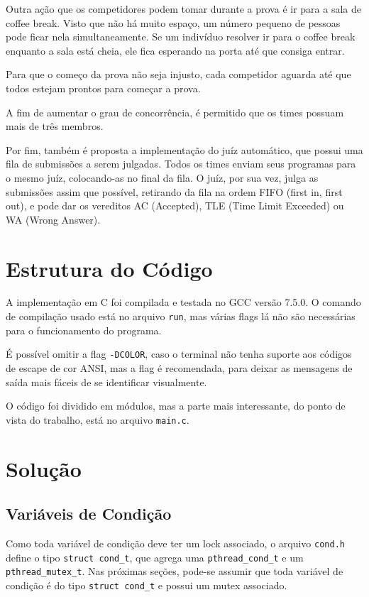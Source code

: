 \documentclass[11pt]{article}
\newcommand{\code}{\lstinline[mathescape=true]}
\begin{document}
Outra ação que os competidores podem tomar durante a prova é ir para a sala de coffee break. Visto
que não há muito espaço, um número pequeno de pessoas pode ficar nela simultaneamente. Se um
indivíduo resolver ir para o coffee break enquanto a sala está cheia, ele fica esperando na porta até
que consiga entrar.

Para que o começo da prova não seja injusto, cada competidor aguarda até que todos estejam prontos
para começar a prova.

A fim de aumentar o grau de concorrência, é permitido que os times possuam mais de três membros.

Por fim, também é proposta a implementação do juíz automático, que possui uma fila de submissões a
serem julgadas. Todos os times enviam seus programas para o mesmo juíz, colocando-as no final da
fila. O juíz, por sua vez, julga as submissões assim que possível, retirando da fila na ordem FIFO
(first in, first out), e pode dar os vereditos AC (Accepted), TLE (Time Limit Exceeded) ou WA (Wrong
Answer).

\section{Estrutura do Código}
A implementação em C foi compilada e testada no GCC versão 7.5.0. O comando de compilação usado está no
arquivo \code{run}, mas várias flags lá não são necessárias para o funcionamento do programa.

É possível omitir a flag \code{-DCOLOR}, caso o terminal não tenha suporte aos códigos de escape de
cor ANSI\cite{ansi_color}, mas a flag é recomendada, para deixar as mensagens de saída mais fáceis de
se identificar visualmente.

O código foi dividido em módulos, mas a parte mais interessante, do ponto de vista do trabalho, está
no arquivo \code{main.c}.

\section{Solução}

\subsection{Variáveis de Condição}
Como toda variável de condição deve ter um lock associado, o arquivo \code{cond.h} define o tipo
\code{struct cond_t}, que agrega uma \code{pthread_cond_t} e um \code{pthread_mutex_t}. Nas próximas
seções, pode-se assumir que toda variável de condição é do tipo \code{struct cond_t} e possui um
mutex associado.
\end{document}
